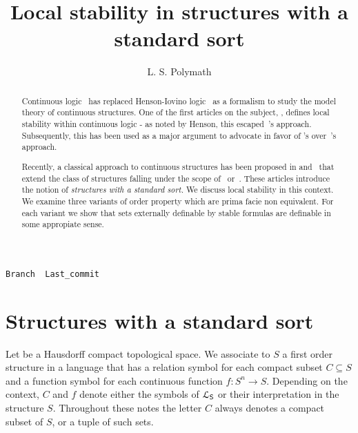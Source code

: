 \documentclass{amsproc}
\author{L. S. Polymath}
\theoremstyle{mio}
\renewcommand*{\emph}[1]{%
   \smash{\tikz[baseline]\node[rectangle, fill=teal!25, rounded corners, inner xsep=0.5ex, inner ysep=0.2ex, anchor=base, minimum height = 2.7ex]{\strut #1};}}
\newcommand\branch{}
\begin{document}
\title{Local stability in structures with a standard sort}
\hfill\texttt{Branch \branch\ Last\_commit \ \DTMnow}\par
\maketitle
\raggedbottom

\begin{abstract}
  Continuous logic~\cite{BBHU} has replaced Henson-Iovino logic~\cite{HI} as a
  formalism to study the model theory of continuous structures.
  One of the first articles on the subject, \cite{BU}, defines local stability within continuous logic - as noted by Henson, this escaped~\cite{HI}'s approach.
  Subsequently, this has been used as a major argument to advocate in favor of \cite{BBHU}'s over~\cite{HI}'s approach.\smallskip

  \noindent
  Recently, a classical approach to continuous structures has been proposed  in \cite{clcl} and~\cite{Z} that extend the class of structures falling under the scope of~\cite{HI} or~\cite{BBHU}.
  These articles introduce the notion of \textit{structures with a standard sort.}
  We discuss local stability in this context.
  We examine three variants of order property which are prima facie non equivalent.
  For each variant we show that sets externally definable by stable formulas are definable in some appropiate sense.
\end{abstract}

\def\medrel#1{\parbox{6ex}{\hfil $#1$}}
\def\ceq#1#2#3{\parbox[t]{13ex}{$\displaystyle #1$}\medrel{#2}{$\displaystyle #3$}}

\section{Structures with a standard sort}

Let \emph{$S$\/} be a Hausdorff compact topological space.
We associate to $S$ a first order structure in a language \emph{${\EuScript L}_{\sf S}$\/} that has a relation symbol for each compact subset $C\subseteq S$ and a function symbol for each continuous function $f:S^n\to S$.
Depending on the context, $C$ and $f$ denote either the symbols of ${\EuScript L}_{\sf S}$ or their interpretation in the structure $S$.
Throughout these notes the letter $C$ always denotes a compact subset of $S$, or a tuple of such sets.
\end{document}

